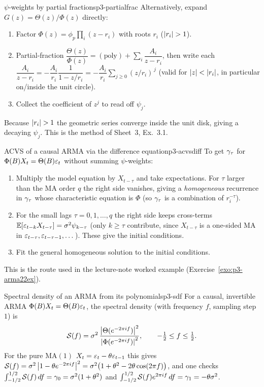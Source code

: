 \begin{keytech}{$\psi$-weights by partial fractions}{p3-partialfrac}
Alternatively, expand $G(z)=\Theta(z)/\Phi(z)$ directly:
\begin{enumerate}
  \item Factor $\Phi(z)=\phi_p\prod_{i}(z-r_i)$ with roots $r_i$ ($\left\lvert r_i \right\rvert>1$).
  \item Partial-fraction $\dfrac{\Theta(z)}{\Phi(z)}
        =(\text{poly})+\sum_i\dfrac{A_i}{z-r_i}$, then write each
        $\dfrac{A_i}{z-r_i}=-\dfrac{A_i}{r_i}\dfrac{1}{1-z/r_i}
        =-\dfrac{A_i}{r_i}\sum_{j\ge0}(z/r_i)^{\,j}$ (valid for
        $\left\lvert z \right\rvert<\left\lvert r_i \right\rvert$, in particular on/inside the unit circle).
  \item Collect the coefficient of $z^j$ to read off $\psi_j$.
\end{enumerate}
Because $\left\lvert r_i \right\rvert>1$ the geometric series converge inside the unit disk,
giving a decaying $\psi_j$. This is the method of Sheet~3, Ex.~3.1.
\end{keytech}

\begin{keytech}{ACVS of a causal ARMA via the difference equation}{p3-acvsdiff}
To get $\gamma_\tau$ for $\Phi(B)X_t=\Theta(B)\varepsilon_t$ without summing
$\psi$-weights:
\begin{enumerate}
  \item Multiply the model equation by $X_{t-\tau}$ and take expectations. For
        $\tau$ larger than the MA order $q$ the right side vanishes, giving a
        \emph{homogeneous} recurrence in $\gamma_\tau$ whose characteristic
        equation is $\Phi$ (so $\gamma_\tau$ is a combination of $r_i^{-\tau}$).
  \item For the small lags $\tau=0,1,\dots,q$ the right side keeps cross-terms
        $\mathbb{E}[\varepsilon_{t-k}X_{t-\tau}]=\sigma^2\psi_{k-\tau}$ (only $k\ge\tau$
        contribute, since $X_{t-\tau}$ is a one-sided MA in
        $\varepsilon_{t-\tau},\varepsilon_{t-\tau-1},\dots$). These give the initial
        conditions.
  \item Fit the general homogeneous solution to the initial conditions.
\end{enumerate}
This is the route used in the lecture-note worked example
(Exercise~\ref{exo:p3-arma22ex}).
\end{keytech}

\begin{keytech}{Spectral density of an ARMA from its polynomials}{p3-sdf}
For a causal, invertible ARMA $\Phi(B)X_t=\Theta(B)\varepsilon_t$, the spectral
density (with frequency $f$, sampling step $1$) is
\[
\mathcal{S}(f)=\sigma^2\,\frac{\left\lvert \Theta(e^{-2\pi i f}) \right\rvert^2}{\left\lvert \Phi(e^{-2\pi i f}) \right\rvert^2},
\qquad -\tfrac12\le f\le\tfrac12 .
\]
For the pure $\mathrm{MA}(1)$ $X_t=\varepsilon_t-\theta\varepsilon_{t-1}$ this gives
$\mathcal{S}(f)=\sigma^2\left\lvert 1-\theta e^{-2\pi i f} \right\rvert^2
=\sigma^2\big(1+\theta^2-2\theta\cos(2\pi f)\big)$, and one checks
$\int_{-1/2}^{1/2}\mathcal{S}(f)\,df=\gamma_0=\sigma^2(1+\theta^2)$ and
$\int_{-1/2}^{1/2}\mathcal{S}(f)e^{2\pi i f}\,df=\gamma_1=-\theta\sigma^2$.
\end{keytech}

